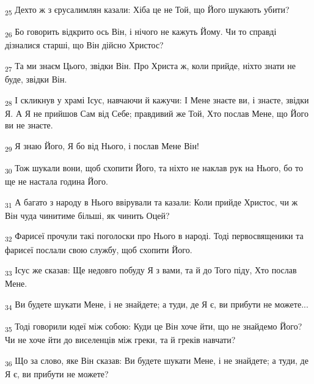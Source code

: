 \begin{tcolorbox}
\textsubscript{25} Дехто ж з єрусалимлян казали: Хіба це не Той, що Його шукають убити?
\end{tcolorbox}
\begin{tcolorbox}
\textsubscript{26} Бо говорить відкрито ось Він, і нічого не кажуть Йому. Чи то справді дізналися старші, що Він дійсно Христос?
\end{tcolorbox}
\begin{tcolorbox}
\textsubscript{27} Та ми знаєм Цього, звідки Він. Про Христа ж, коли прийде, ніхто знати не буде, звідки Він.
\end{tcolorbox}
\begin{tcolorbox}
\textsubscript{28} І скликнув у храмі Ісус, навчаючи й кажучи: І Мене знаєте ви, і знаєте, звідки Я. А Я не прийшов Сам від Себе; правдивий же Той, Хто послав Мене, що Його ви не знаєте.
\end{tcolorbox}
\begin{tcolorbox}
\textsubscript{29} Я знаю Його, Я бо від Нього, і послав Мене Він!
\end{tcolorbox}
\begin{tcolorbox}
\textsubscript{30} Тож шукали вони, щоб схопити Його, та ніхто не наклав рук на Нього, бо то ще не настала година Його.
\end{tcolorbox}
\begin{tcolorbox}
\textsubscript{31} А багато з народу в Нього ввірували та казали: Коли прийде Христос, чи ж Він чуда чинитиме більші, як чинить Оцей?
\end{tcolorbox}
\begin{tcolorbox}
\textsubscript{32} Фарисеї прочули такі поголоски про Нього в народі. Тоді первосвященики та фарисеї послали свою службу, щоб схопити Його.
\end{tcolorbox}
\begin{tcolorbox}
\textsubscript{33} Ісус же сказав: Ще недовго побуду Я з вами, та й до Того піду, Хто послав Мене.
\end{tcolorbox}
\begin{tcolorbox}
\textsubscript{34} Ви будете шукати Мене, і не знайдете; а туди, де Я є, ви прибути не можете...
\end{tcolorbox}
\begin{tcolorbox}
\textsubscript{35} Тоді говорили юдеї між собою: Куди це Він хоче йти, що не знайдемо Його? Чи не хоче йти до виселенців між греки, та й греків навчати?
\end{tcolorbox}
\begin{tcolorbox}
\textsubscript{36} Що за слово, яке Він сказав: Ви будете шукати Мене, і не знайдете; а туди, де Я є, ви прибути не можете?
\end{tcolorbox}
